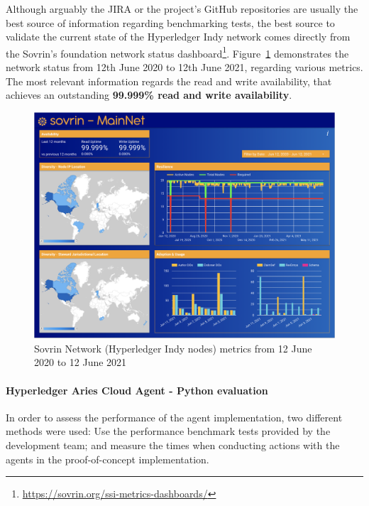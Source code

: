 Although arguably the JIRA or the project's GitHub repositories are usually the best source of information regarding benchmarking tests, the best source to validate the current state of the Hyperledger Indy network comes directly from the Sovrin's foundation network status dashboard\footnote{\url{https://sovrin.org/ssi-metrics-dashboards/}}. Figure~\ref{fig:sovrin_metrics} demonstrates the network status from 12th June 2020 to 12th June 2021, regarding various metrics. The most relevant information regards the read and write availability, that achieves an outstanding \textbf{99.999\% read and write availability}.

\begin{figure}[!htb]
    \centering
    \includegraphics[width=0.8\linewidth]{images/sovrin_metrics.png}
    \caption{Sovrin Network (Hyperledger Indy nodes) metrics from 12 June 2020 to 12 June 2021}
    \label{fig:sovrin_metrics}
\end{figure}

\paragraph{Hyperledger Aries Cloud Agent - Python evaluation}

In order to assess the performance of the agent implementation, two different methods were used: Use the performance benchmark tests provided by the development team; and measure the times when conducting actions with the agents in the proof-of-concept implementation.

